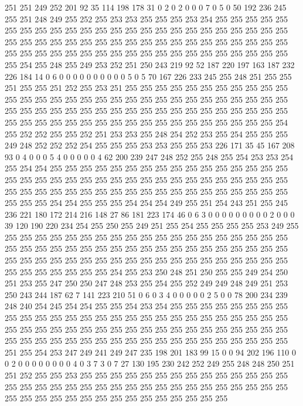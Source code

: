 251 251 249 252 201 92 35 114 198 178 31 0 2 0 2 0 0 0 7 0
5 0 50 192 236 245 255 251 248 249 255 252 255 253 253 255 255 255 253 254
255 255 255 255 255 255 255 255 255 255 255 255 255 255 255 255 255 255 255 255
255 255 255 255 255 255 255 255 255 255 255 255 255 255 255 255 255 255 255 255
255 255 255 255 255 255 255 255 255 255 255 255 255 255 255 255 255 255 255 255
255 255 255 254 255 248 255 249 253 252 251 250 243 219 92 52 187 220 197 163
187 232 226 184 14 0 6 0 0 0 0 0 0 0 0 0 0 5 0 5
70 167 226 233 245 255 248 251 255 255 251 255 255 251 252 255 253 251 255 255
255 255 255 255 255 255 255 255 255 255 255 255 255 255 255 255 255 255 255 255
255 255 255 255 255 255 255 255 255 255 255 255 255 255 255 255 255 255 255 255
255 255 255 255 255 255 255 255 255 255 255 255 255 255 255 255 255 255 255 255
255 255 255 255 255 254 255 252 252 255 255 252 251 253 253 255 248 254 252 253
255 254 255 255 255 249 248 252 252 252 254 255 255 255 253 253 255 255 253 226
171 35 45 167 208 93 0 4 0 0 0 5 4 0 0 0 0 0 4 62
200 239 247 248 252 255 248 255 254 253 253 254 255 254 254 255 255 255 255 255
255 255 255 255 255 255 255 255 255 255 255 255 255 255 255 255 255 255 255 255
255 255 255 255 255 255 255 255 255 255 255 255 255 255 255 255 255 255 255 255
255 255 255 255 255 255 255 255 255 255 255 255 254 254 255 255 255 254 254 254
249 255 251 254 243 251 255 245 236 221 180 172 214 216 148 27 86 181 223 174
46 0 6 3 0 0 0 0 0 0 0 0 0 2 0 0 0 39 120 190
220 234 254 255 250 255 249 251 255 254 255 255 255 255 253 249 255 255 255 255
255 255 255 255 255 255 255 255 255 255 255 255 255 255 255 255 255 255 255 255
255 255 255 255 255 255 255 255 255 255 255 255 255 255 255 255 255 255 255 255
255 255 255 255 255 255 255 255 255 255 255 255 255 255 255 255 255 255 255 255
255 254 255 253 250 248 251 250 255 255 249 254 250 251 253 255 247 250 250 247
248 253 255 254 255 252 249 249 248 249 251 253 250 243 244 187 62 7 141 223
210 51 0 6 0 3 4 0 0 0 0 0 2 5 0 0 78 200 234 239
248 240 254 245 254 254 255 255 254 253 254 255 255 255 255 255 255 255 255 255
255 255 255 255 255 255 255 255 255 255 255 255 255 255 255 255 255 255 255 255
255 255 255 255 255 255 255 255 255 255 255 255 255 255 255 255 255 255 255 255
255 255 255 255 255 255 255 255 255 255 255 255 255 255 255 255 251 255 254 253
247 249 241 249 247 235 198 201 183 99 15 0 0 94 202 196 110 0 0 2
0 0 0 0 0 0 0 0 4 0 3 7 3 0 7 27 130 195 230 242
252 249 255 248 248 250 251 251 252 255 255 253 255 255 255 255 255 255 255 255
255 255 255 255 255 255 255 255 255 255 255 255 255 255 255 255 255 255 255 255
255 255 255 255 255 255 255 255 255 255 255 255 255 255 255 255 255 255 255 255
